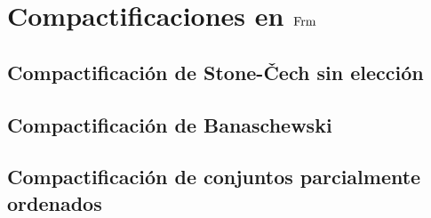 \chapter{Compactificaciones en $\mathrm{Frm}$}
\section{Compactificación de Stone-\v{C}ech sin elección}
\section{Compactificación de Banaschewski}
\section{Compactificación de conjuntos parcialmente ordenados}